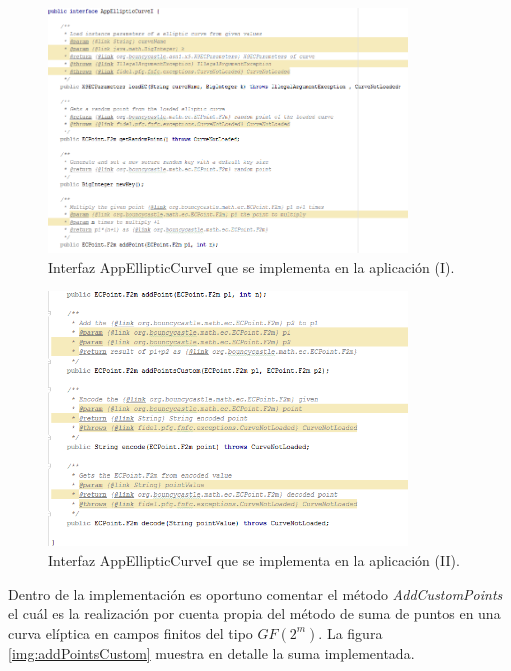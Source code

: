 \documentclass[../PFC.tex]{subfiles}
\begin{document}
\begin{figure}[H]
  \centering
  \includegraphics[width=0.85\textwidth]{./img/eci1}
  \caption{Interfaz AppEllipticCurveI que se implementa en la aplicación (I).}
  \label{img:eci1}
\end{figure}
 
\begin{figure}[H]
  \centering
  \includegraphics[width=0.85\textwidth]{./img/eci2}
  \caption{Interfaz AppEllipticCurveI que se implementa en la aplicación (II).}
  \label{img:eci2}
\end{figure}

Dentro de la implementación es oportuno comentar el método \textit{AddCustomPoints} el cuál es la realización por cuenta propia del método de suma de puntos en una curva elíptica en campos finitos del tipo \(GF(2^m)\). La figura \ref{img:addPointsCustom} muestra en detalle la suma implementada.
\end{document}
